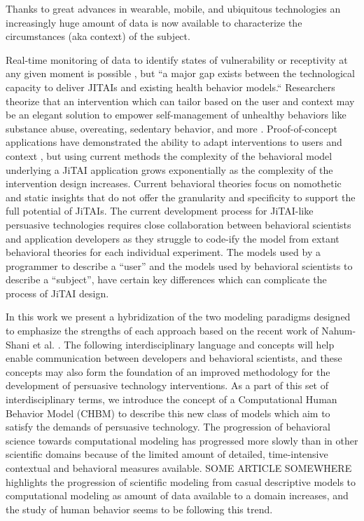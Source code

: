 \documentclass[runningheads,a4paper]{llncs}
\begin{document}
Thanks to great advances in wearable, mobile, and ubiquitous technologies an increasingly huge amount of data is now available to characterize the circumstances (aka context) of the subject.

Real-time monitoring of data to identify states of vulnerability or receptivity at any given moment is possible \cite{Hekler, Klasnja, Traver, and Hendriks, 2013}, but “a major gap exists between the technological capacity to deliver JITAIs and existing health behavior models.“ \cite{nahum2014}
Researchers theorize that an intervention which can tailor based on the user and context may be an elegant solution to empower self-management of unhealthy behaviors like substance abuse, overeating, sedentary behavior, and more \cite{nahum2014, Hekler, Patrick, and Michie, 2016}.
Proof-of-concept applications have demonstrated the ability to adapt interventions to users \cite{dallery2014optimizing, beck2010challenges} and context \cite{brailsford2010towards, collins2004}, but using current methods the complexity of the behavioral model underlying a JiTAI application grows exponentially as the complexity of the intervention design increases. 
Current behavioral theories focus on nomothetic and static insights that do not offer the granularity and specificity to support the full potential of JiTAIs\cite{riley2011health}.
The current development process for JiTAI-like persuasive technologies requires close collaboration between behavioral scientists and application developers as they struggle to code-ify the model from extant behavioral theories for each individual experiment.
The models used by a programmer to describe a “user” and the models used by behavioral scientists to describe a “subject”, have certain key differences which can complicate the process of JiTAI design.

In this work we present a hybridization of the two modeling paradigms designed to emphasize the strengths of each approach based on the recent work of Nahum-Shani et al. \cite{nahum2014}.
The following interdisciplinary language and concepts will help enable communication between developers and behavioral scientists, and these concepts may also form the foundation of an improved methodology for the development of persuasive technology interventions.
As a part of this set of interdisciplinary terms, we introduce the concept of a Computational Human Behavior Model (CHBM) to describe this new class of models which aim to satisfy the demands of persuasive technology.
The progression of behavioral science towards computational modeling has progressed more slowly than in other scientific domains because of the limited amount of detailed, time-intensive contextual and behavioral measures available.
SOME ARTICLE SOMEWHERE highlights the progression of scientific modeling from casual descriptive models to computational modeling as amount of data available to a domain increases, and the study of human behavior seems to be following this trend. \cite{THAT ONE ARTICLE}
\end{document}
